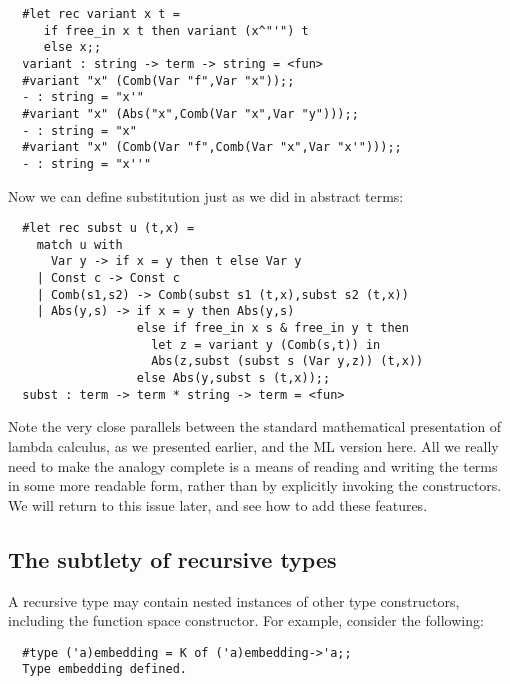 \begin{boxed}\begin{verbatim}
  #let rec variant x t =
     if free_in x t then variant (x^"'") t
     else x;;
  variant : string -> term -> string = <fun>
  #variant "x" (Comb(Var "f",Var "x"));;
  - : string = "x'"
  #variant "x" (Abs("x",Comb(Var "x",Var "y")));;
  - : string = "x"
  #variant "x" (Comb(Var "f",Comb(Var "x",Var "x'")));;
  - : string = "x''"
\end{verbatim}\end{boxed}

\noindent Now we can define substitution just as we did in abstract terms:

\begin{boxed}\begin{verbatim}
  #let rec subst u (t,x) =
    match u with
      Var y -> if x = y then t else Var y
    | Const c -> Const c
    | Comb(s1,s2) -> Comb(subst s1 (t,x),subst s2 (t,x))
    | Abs(y,s) -> if x = y then Abs(y,s)
                  else if free_in x s & free_in y t then
                    let z = variant y (Comb(s,t)) in
                    Abs(z,subst (subst s (Var y,z)) (t,x))
                  else Abs(y,subst s (t,x));;
  subst : term -> term * string -> term = <fun>
\end{verbatim}\end{boxed}

Note the very close parallels between the standard mathematical presentation of
lambda calculus, as we presented earlier, and the ML version here. All we
really need to make the analogy complete is a means of reading and writing the
terms in some more readable form, rather than by explicitly invoking the
constructors. We will return to this issue later, and see how to add these
features.

\subsection{The subtlety of recursive types}

A recursive type may contain nested instances of other type constructors,
including the function space constructor. For example, consider the following:

\begin{boxed}\begin{verbatim}
  #type ('a)embedding = K of ('a)embedding->'a;;
  Type embedding defined.
\end{verbatim}\end{boxed}


